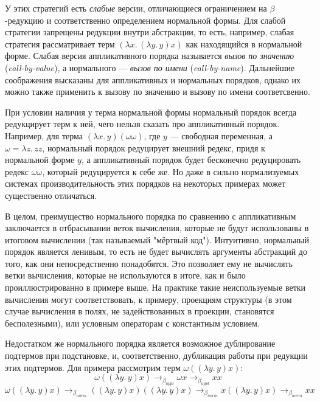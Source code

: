 \documentclass[../diploma.tex]{subfiles}
\begin{document}
У этих стратегий есть \textit{слабые} версии, отличающиеся ограничением на $\beta$-редукцию и соответственно определением нормальной формы. Для слабой стратегии запрещены редукции внутри абстракции, то есть, например, слабая стратегия рассматривает терм $(\lambda x.\, (\lambda y.\, y) x)$ как находящийся в нормальной форме. Слабая версия аппликативного порядка называется \textit{вызов по значению} (\textit{call-by-value}), а нормального --- \textit{вызов по имени} (\textit{call-by-name}). Дальнейшие соображения высказаны для аппликативных и нормальных порядков, однако их можно также применить к вызову по значению и вызову по имени соответсвенно.

При условии наличия у терма нормальной формы нормальный порядок всегда редукцирует терм к ней, чего нельзя сказать про аппликативный порядок. Например, для терма $(\lambda x.\, y) (\omega \omega)$, где $y$ --- свободная переменная, а $\omega = \lambda z.\, z z$, нормальный порядок редуцирует внешний редекс, придя к нормальной форме $y$, а аппликативный порядок будет бесконечно редуцировать редекс $\omega \omega$, который редуцируется к себе же. Но даже в сильно нормализуемых системах производительность этих порядков на некоторых примерах может существенно отличаться.

В целом, преимущество нормального порядка по сравнению с аппликативным заключается в отбрасывании веток вычисления, которые не будут использованы в итоговом вычислении (так называемый "мёртвый код"). Интуитивно, нормальный порядок является ленивым, то есть не будет вычислять аргументы абстракций до того, как они непосредственно понадобятся. Это позволяет ему не вычислять ветки вычисления, которые не используются в итоге, как и было проиллюстрированно в примере выше. На практике такие неиспользуемые ветки вычисления могут соответствовать, к примеру, проекциям структуры (в этом случае вычисления в полях, не задействованных в проекции, становятся бесполезными), или условным операторам с константным условием.

Недостатком же нормального порядка является возможное дублирование подтермов при подстановке, и, соответственно, дубликация работы при редукции этих подтермов. Для примера рассмотрим терм $\omega ((\lambda y.\, y) x)$: $$\omega ((\lambda y.\, y) x) \rightarrow_{\beta_{appl}} \omega x \rightarrow_{\beta_{appl}} x x$$ $$ \omega ((\lambda y.\, y) x) \rightarrow_{\beta_{norm}} ((\lambda y.\, y) x) ((\lambda y.\, y) x) \rightarrow_{\beta_{norm}} x ((\lambda y.\, y) x) \rightarrow_{\beta_{norm}} x x$$
\end{document}
